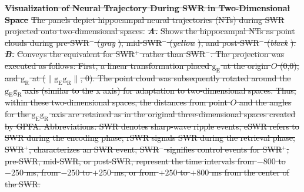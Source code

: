 \documentclass[preprint,review,12pt]{elsarticle}%
\providecommand{\DIFdeltex}[1]{{\protect\color{red}\sout{#1}}}                      %
\providecommand{\DIFdelFL}[1]{\DIFdel{#1}} %
\providecommand{\DIFdelbeginFL}{} %
\providecommand{\DIFdelendFL}{} %
\providecommand{\DIFdel}[1]{\texorpdfstring{\DIFdeltex{#1}}{}} %
\newcommand{\DIFscaledelfig}{0.5}
\newlength{\DIFdelgraphicswidth} %
\newlength{\DIFdelgraphicsheight} %
\newcommand{\DIFdelincludegraphics}[2][]{%
\sbox{\DIFdelgraphicsbox}{\DIFOincludegraphics[#1]{#2}}%
\settoboxwidth{\DIFdelgraphicswidth}{\DIFdelgraphicsbox} %
\settoboxtotalheight{\DIFdelgraphicsheight}{\DIFdelgraphicsbox} %
\scalebox{\DIFscaledelfig}{%
\parbox[b]{\DIFdelgraphicswidth}{\usebox{\DIFdelgraphicsbox}\\[-\baselineskip] \rule{\DIFdelgraphicswidth}{0em}}\llap{\resizebox{\DIFdelgraphicswidth}{\DIFdelgraphicsheight}{%
\setlength{\unitlength}{\DIFdelgraphicswidth}%
\begin{picture}(1,1)%
\thicklines\linethickness{2pt} %
{\color[rgb]{1,0,0}\put(0,0){\framebox(1,1){}}}%
{\color[rgb]{1,0,0}\put(0,0){\line( 1,1){1}}}%
{\color[rgb]{1,0,0}\put(0,1){\line(1,-1){1}}}%
\end{picture}%
}\hspace*{3pt}}} %
} %
\DeclareRobustCommand{\DIFdelbeginFL}{\DIFOdelbeginFL \let\includegraphics\DIFdelincludegraphics} %
\DeclareRobustCommand{\DIFdelendFL}{\DIFOaddendFL \let\includegraphics\DIFOincludegraphics} %
\begin{document}
        \begin{figure*}[ht]
            \DIFdelbeginFL %
{%
\textbf{\DIFdelFL{Visualization of Neural Trajectory During SWR in Two-Dimensional Space
}}
\DIFdelFL{The panels depict hippocampal neural trajectories (NTs) during SWR projected onto two-dimensional spaces. }\textbf{\textit{\DIFdelFL{A.}}%
} %
\DIFdelFL{Shows the hippocampal NTs as point clouds during pre-SWR$^-$ (}\textit{\DIFdelFL{gray}}%
\DIFdelFL{), mid-SWR$^-$ (}\textit{\DIFdelFL{yellow}}%
\DIFdelFL{), and post-SWR$^-$ (}\textit{\DIFdelFL{black}}%
\DIFdelFL{). }\textbf{\textit{\DIFdelFL{B.}}%
} %
\DIFdelFL{Conveys the equivalent for SWR$^+$ rather than SWR$^-$. The projection was executed as follows: First, a linear transformation placed $\mathrm{g_{E}}$ at the origin $O$ (0,0), and $\mathrm{g_{R}}$ at ($\lVert \mathrm{g_{E}g_{R}} \rVert$, 0). The point cloud was subsequently rotated around the $\mathrm{g_{E}g_{R}}$ axis (similar to the x axis) for adaptation to two-dimensional spaces. Thus, within these two-dimensional spaces, the distances from point $O$ and the angles for the $\mathrm{g_{E}g_{R}}$ axis are retained as in the original three-dimensional spaces created by GPFA. Abbreviations: SWR denotes sharp-wave ripple events; eSWR refers to SWR during the encoding phase; rSWR signals SWR during the retrieval phase; SWR$^+$, characterizes an SWR event; SWR$^-$ signifies control events for SWR$^+$; pre-SWR, mid-SWR, or post-SWR, represent the time intervals from $-800$ to $-250$ ms, from $-250$ to $+250$ ms, or from $+250$ to $+800$ ms from the center of the SWR.
}}
\DIFdelendFL {}
        	\centering
\DIFdelbeginFL %
\DIFdelendFL %

\end{figure*}
\end{document}
